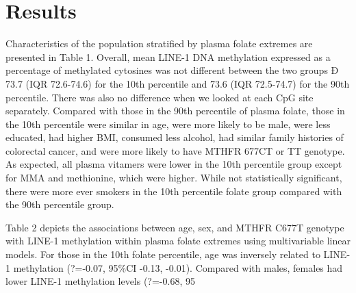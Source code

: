 \section{Results}
Characteristics of the population stratified by plasma folate extremes are presented in Table 1. Overall, mean LINE-1 DNA methylation expressed as a percentage of methylated cytosines was not different between the two groups Ð 73.7 (IQR 72.6-74.6) for the 10th percentile and 73.6 (IQR 72.5-74.7) for the 90th percentile. There was also no difference when we looked at each CpG site separately. Compared with those in the 90th percentile of plasma folate, those in the 10th percentile were similar in age, were more likely to be male, were less educated, had higher BMI, consumed less alcohol, had similar family histories of colorectal cancer, and were more likely to have MTHFR 677CT or TT genotype. As expected, all plasma vitamers were lower in the 10th percentile group except for MMA and methionine, which were higher. While not statistically significant, there were more ever smokers in the 10th percentile folate group compared with the 90th percentile group.

\noindent Table 2 depicts the associations between age, sex, and MTHFR C677T genotype with LINE-1 methylation within plasma folate extremes using multivariable linear models. For those in the 10th folate percentile, age was inversely related to LINE-1 methylation (?=-0.07, 95\%CI -0.13, -0.01). Compared with males, females had lower LINE-1 methylation levels (?=-0.68, 95%


